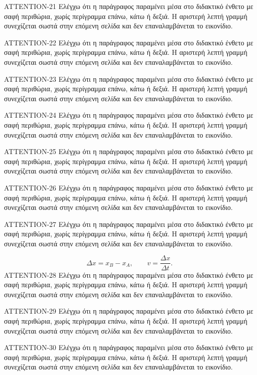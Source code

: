 \begin{AttentionBox}
ATTENTION-21 Ελέγχω ότι η παράγραφος παραμένει μέσα στο διδακτικό ένθετο με σαφή περιθώρια, χωρίς περίγραμμα επάνω, κάτω ή δεξιά. Η αριστερή λεπτή γραμμή συνεχίζεται σωστά στην επόμενη σελίδα και δεν επαναλαμβάνεται το εικονίδιο.\par
ATTENTION-22 Ελέγχω ότι η παράγραφος παραμένει μέσα στο διδακτικό ένθετο με σαφή περιθώρια, χωρίς περίγραμμα επάνω, κάτω ή δεξιά. Η αριστερή λεπτή γραμμή συνεχίζεται σωστά στην επόμενη σελίδα και δεν επαναλαμβάνεται το εικονίδιο.\par
ATTENTION-23 Ελέγχω ότι η παράγραφος παραμένει μέσα στο διδακτικό ένθετο με σαφή περιθώρια, χωρίς περίγραμμα επάνω, κάτω ή δεξιά. Η αριστερή λεπτή γραμμή συνεχίζεται σωστά στην επόμενη σελίδα και δεν επαναλαμβάνεται το εικονίδιο.\par
ATTENTION-24 Ελέγχω ότι η παράγραφος παραμένει μέσα στο διδακτικό ένθετο με σαφή περιθώρια, χωρίς περίγραμμα επάνω, κάτω ή δεξιά. Η αριστερή λεπτή γραμμή συνεχίζεται σωστά στην επόμενη σελίδα και δεν επαναλαμβάνεται το εικονίδιο.\par
ATTENTION-25 Ελέγχω ότι η παράγραφος παραμένει μέσα στο διδακτικό ένθετο με σαφή περιθώρια, χωρίς περίγραμμα επάνω, κάτω ή δεξιά. Η αριστερή λεπτή γραμμή συνεχίζεται σωστά στην επόμενη σελίδα και δεν επαναλαμβάνεται το εικονίδιο.\par
ATTENTION-26 Ελέγχω ότι η παράγραφος παραμένει μέσα στο διδακτικό ένθετο με σαφή περιθώρια, χωρίς περίγραμμα επάνω, κάτω ή δεξιά. Η αριστερή λεπτή γραμμή συνεχίζεται σωστά στην επόμενη σελίδα και δεν επαναλαμβάνεται το εικονίδιο.\par
ATTENTION-27 Ελέγχω ότι η παράγραφος παραμένει μέσα στο διδακτικό ένθετο με σαφή περιθώρια, χωρίς περίγραμμα επάνω, κάτω ή δεξιά. Η αριστερή λεπτή γραμμή συνεχίζεται σωστά στην επόμενη σελίδα και δεν επαναλαμβάνεται το εικονίδιο.\par
\[\Delta x=x_B-x_A,\qquad v=\frac{\Delta x}{\Delta t}.\]
ATTENTION-28 Ελέγχω ότι η παράγραφος παραμένει μέσα στο διδακτικό ένθετο με σαφή περιθώρια, χωρίς περίγραμμα επάνω, κάτω ή δεξιά. Η αριστερή λεπτή γραμμή συνεχίζεται σωστά στην επόμενη σελίδα και δεν επαναλαμβάνεται το εικονίδιο.\par
ATTENTION-29 Ελέγχω ότι η παράγραφος παραμένει μέσα στο διδακτικό ένθετο με σαφή περιθώρια, χωρίς περίγραμμα επάνω, κάτω ή δεξιά. Η αριστερή λεπτή γραμμή συνεχίζεται σωστά στην επόμενη σελίδα και δεν επαναλαμβάνεται το εικονίδιο.\par
ATTENTION-30 Ελέγχω ότι η παράγραφος παραμένει μέσα στο διδακτικό ένθετο με σαφή περιθώρια, χωρίς περίγραμμα επάνω, κάτω ή δεξιά. Η αριστερή λεπτή γραμμή συνεχίζεται σωστά στην επόμενη σελίδα και δεν επαναλαμβάνεται το εικονίδιο.\par

\end{AttentionBox}
